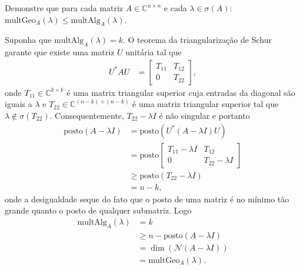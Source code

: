 \begin{questions}
     Demonstre que para cada matriz $A \in \mathbb{C}^{n \times n}$ e cada $\lambda \in \sigma(A)$: $\mathrm{multGeo}_A(\lambda) \leq \mathrm{multAlg}_A(\lambda)$.
    \begin{solution}
        Suponha que $\mathrm{multAlg}_A(\lambda) = k$. O teorema da triangulariza\c{c}\~{a}o de Schur garante que existe uma matriz $U$ unit\'{a}ria tal que
        \begin{align*}
            U^* A U &= \begin{bmatrix}
                T_{11} & T_{12} \\
                0 & T_{22}
            \end{bmatrix},
        \end{align*}
        onde $T_{11} \in \mathbb{C}^{k \times k}$ \'{e} uma matrix triangular superior cuja entradas da diagonal s\~{a}o iguais a $\lambda$ e $T_{22} \in \mathbb{C}^{(n - k) \times (n - k)}$ \'{e} uma matriz triangular superior tal que $\lambda \not\in \sigma(T_{22})$. Consequentemente, $T_{22} - \lambda I$ \'{e} n\~{a}o singular e portanto
        \begin{align*}
            \mathrm{posto}(A - \lambda I) &= \mathrm{posto}\left( U^* (A - \lambda I) U \right) \\
            &= \mathrm{posto}\begin{bmatrix}
                T_{11} - \lambda I & T_{12} \\
                0 & T_{22} - \lambda I
            \end{bmatrix} \\
            &\geq \mathrm{posto}(T_{22} - \lambda I) \\
            &= n - k,
        \end{align*}
        onde a desigualdade seque do fato que o posto de uma matriz \'{e} no m\'{i}nimo t\~{a}o grande quanto o posto de qualquer submatriz. Logo
        \begin{align*}
            \mathrm{multAlg}_A(\lambda) &= k \\
            &\geq n - \mathrm{posto}(A - \lambda I) \\
            &= \dim(\mathcal{N}(A - \lambda I)) \\
            &= \mathrm{multGeo}_A(\lambda).
        \end{align*}
    \end{solution}


\end{questions}
